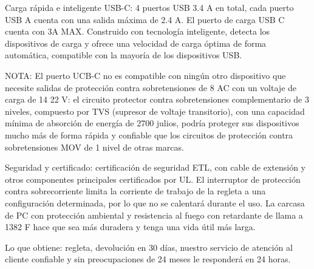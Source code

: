     Carga rápida e inteligente USB-C: 4 puertos USB 3.4 A en total, cada puerto USB A cuenta con una salida máxima de 2.4 A. El puerto de carga USB C cuenta con 3A MAX. Construido con tecnología inteligente, detecta los dispositivos de carga y ofrece una velocidad de carga óptima de forma automática, compatible con la mayoría de los dispositivos USB.
    
    NOTA: El puerto UCB-C no es compatible con ningún otro dispositivo que necesite
    salidas de protección contra sobretensiones de 8 AC con un voltaje de carga de 14 22 V: el circuito protector contra sobretensiones complementario de 3 niveles, compuesto por TVS (supresor de voltaje transitorio), con una capacidad mínima de absorción de energía de 2700 julios, podría proteger sus dispositivos mucho más de forma rápida y confiable que los circuitos de protección contra sobretensiones MOV de 1 nivel de otras marcas.
    
    Seguridad y certificado: certificación de seguridad ETL, con cable de extensión y otros componentes principales certificados por UL. El interruptor de protección contra sobrecorriente limita la corriente de trabajo de la regleta a una configuración determinada, por lo que no se calentará durante el uso. La carcasa de PC con protección ambiental y resistencia al fuego con retardante de llama a 1382 F hace que sea más duradera y tenga una vida útil más larga.
    
    Lo que obtiene: regleta, devolución en 30 días, nuestro servicio de atención al cliente confiable y sin preocupaciones de 24 meses le responderá en 24 horas.
    
